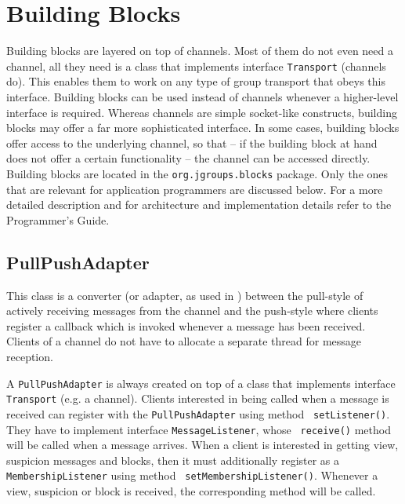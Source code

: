 
\chapter{Building Blocks} \label{BuildingBlocks}

Building blocks are layered on top of channels. Most of them do not even need a
channel, all they need is a class that implements interface {\tt Transport} (channels
do). This enables them to work on any type of group transport that obeys this
interface.  Building blocks can be used instead of channels whenever a higher-level
interface is required. Whereas channels are simple socket-like constructs, building
blocks may offer a far more sophisticated interface. In some cases, building blocks
offer access to the underlying channel, so that -- if the building block at hand does
not offer a certain functionality -- the channel can be accessed directly.  Building
blocks are located in the {\tt org.jgroups.blocks} package. Only the ones that are
relevant for application programmers are discussed below. For a more detailed
description and for architecture and implementation details refer to the Programmer's
Guide.



  \section{PullPushAdapter} \label{PullPushAdapter}

  This class is a converter (or adapter, as used in \cite{Gamma:1995}) between the
  pull-style of actively receiving messages from the channel and the push-style where
  clients register a callback which is invoked whenever a message has been
  received. Clients of a channel do not have to allocate a separate thread for
  message reception.

  A {\tt PullPushAdapter} is always created on top of a class that implements
  interface {\tt Transport} (e.g. a channel). Clients interested in being called when
  a message is received can register with the {\tt PullPushAdapter} using method {\tt
  setListener()}. They have to implement interface {\tt MessageListener}, whose {\tt
  receive()} method will be called when a message arrives. When a client is
  interested in getting view, suspicion messages and blocks, then it must
  additionally register as a {\tt MembershipListener} using method {\tt
  setMembershipListener()}. Whenever a view, suspicion or block is received, the
  corresponding method will be called.

